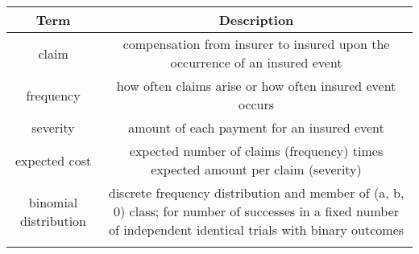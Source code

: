 \documentclass[]{book}
\theoremstyle{definition}
\theoremstyle{definition}
\theoremstyle{definition}
\theoremstyle{remark}
\begin{document}
\begin{longtable}[]{@{}cc@{}}
\toprule
\begin{minipage}[b]{0.43\columnwidth}\centering\strut
Term\strut
\end{minipage} & \begin{minipage}[b]{0.43\columnwidth}\centering\strut
Description\strut
\end{minipage}\tabularnewline
\midrule
\endhead
\begin{minipage}[t]{0.43\columnwidth}\centering\strut
claim\strut
\end{minipage} & \begin{minipage}[t]{0.43\columnwidth}\centering\strut
compensation from insurer to insured upon the occurrence of an insured
event\strut
\end{minipage}\tabularnewline
\begin{minipage}[t]{0.43\columnwidth}\centering\strut
frequency\strut
\end{minipage} & \begin{minipage}[t]{0.43\columnwidth}\centering\strut
how often claims arise or how often insured event occurs\strut
\end{minipage}\tabularnewline
\begin{minipage}[t]{0.43\columnwidth}\centering\strut
severity\strut
\end{minipage} & \begin{minipage}[t]{0.43\columnwidth}\centering\strut
amount of each payment for an insured event\strut
\end{minipage}\tabularnewline
\begin{minipage}[t]{0.43\columnwidth}\centering\strut
expected cost\strut
\end{minipage} & \begin{minipage}[t]{0.43\columnwidth}\centering\strut
expected number of claims (frequency) times expected amount per claim
(severity)\strut
\end{minipage}\tabularnewline
\begin{minipage}[t]{0.43\columnwidth}\centering\strut
binomial distribution\strut
\end{minipage} & \begin{minipage}[t]{0.43\columnwidth}\centering\strut
discrete frequency distribution and member of (a, b, 0) class; for
number of successes in a fixed number of independent identical trials
with binary outcomes\strut
\end{minipage}\tabularnewline
\begin{minipage}[t]{0.43\columnwidth}\centering\strut

\end{minipage}
\end{longtable}
\end{document}
